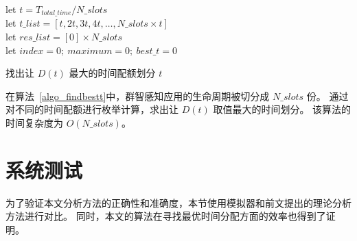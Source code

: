 \begin{algorithm}[h]
\setstretch{\algostretch}
let $t = T_{total\_time}/N\_slots$\\
let $t\_list = [t, 2t, 3t, 4t,\ldots,N\_slots \times t]$\\
let $res\_list = [0] \times N\_slots$\\
let $index = 0;\ maximum = 0;\ best\_t = 0$\\
\caption{找出让 $D(t)$ 最大的时间配额划分 $t$}
\label{algo_findbestt}
\end{algorithm}

在算法~\ref{algo_findbestt}中，群智感知应用的生命周期被切分成 $N\_slots$ 份。
通过对不同的时间配额进行枚举计算，求出让 $D(t)$ 取值最大的时间划分。
该算法的时间复杂度为 $O(N\_slots)$。

\section{系统测试}

为了验证本文分析方法的正确性和准确度，本节使用模拟器和前文提出的理论分析方法进行对比。
同时，本文的算法在寻找最优时间分配方面的效率也得到了证明。

